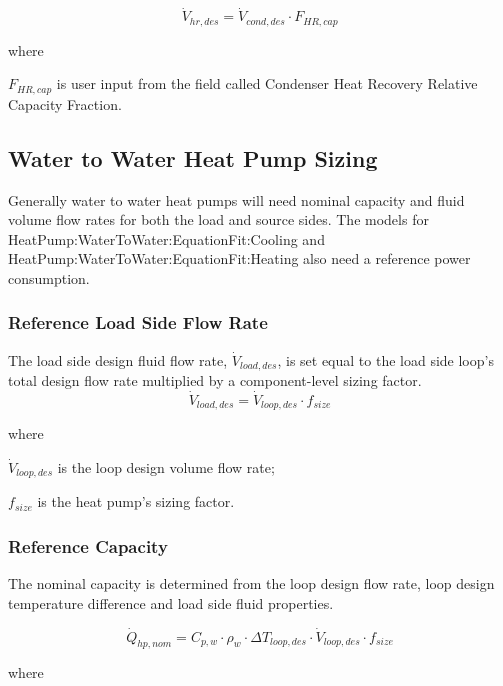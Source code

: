 \begin{equation}
\dot V_{hr,des} = \dot V_{cond,des} \cdot F_{HR,cap}
\end{equation}

where

\( F_{HR,cap} \) is user input from the field called Condenser Heat Recovery Relative Capacity Fraction.


\subsection{Water to Water Heat Pump Sizing}\label{WWHP-sizing}

Generally water to water heat pumps will need nominal capacity and fluid volume flow rates for both the load and source sides.  The models for HeatPump:WaterToWater:EquationFit:Cooling and HeatPump:WaterToWater:EquationFit:Heating also need a reference power consumption.

\subsubsection{Reference Load Side Flow Rate}\label{WWHP-ref-load-side-flow-rate}

The load side design fluid flow rate, \( \dot V_{load,des} \), is set equal to the load side loop's total design flow rate multiplied by a component-level sizing factor.
\begin{equation}
\dot V_{load,des} = \dot V_{loop,des} \cdot f_{size}
\end{equation}

where

\( \dot V_{loop,des} \) is the loop design volume flow rate;

\( f_{size} \) is the heat pump's sizing factor.

\subsubsection{Reference Capacity}\label{wwhp-ref-capacity}

The nominal capacity is determined from the loop design flow rate, loop design temperature difference and load side fluid properties.

\begin{equation}
\dot Q_{hp,nom} = C_{p,w} \cdot \rho_w \cdot \Delta T_{loop,des} \cdot \dot V_{loop,des} \cdot f_{size}
\end{equation}

where

